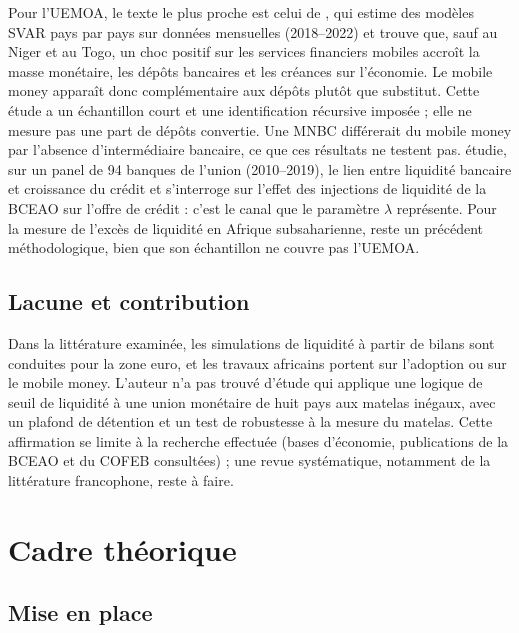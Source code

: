 \documentclass[11pt,a4paper]{article}
\begin{document}
	Pour l'UEMOA, le texte le plus proche est celui de \citet{trinnou2023}, qui estime des modèles SVAR pays par pays sur données mensuelles (2018--2022) et trouve que, sauf au Niger et au Togo, un choc positif sur les services financiers mobiles accroît la masse monétaire, les dépôts bancaires et les créances sur l'économie. Le mobile money apparaît donc complémentaire aux dépôts plutôt que substitut. Cette étude a un échantillon court et une identification récursive imposée ; elle ne mesure pas une part de dépôts convertie. Une MNBC différerait du mobile money par l'absence d'intermédiaire bancaire, ce que ces résultats ne testent pas. \citet{tadenyo2021} étudie, sur un panel de 94 banques de l'union (2010--2019), le lien entre liquidité bancaire et croissance du crédit et s'interroge sur l'effet des injections de liquidité de la BCEAO sur l'offre de crédit : c'est le canal que le paramètre $\lambda$ représente. Pour la mesure de l'excès de liquidité en Afrique subsaharienne, \citet{saxegaard2006} reste un précédent méthodologique, bien que son échantillon ne couvre pas l'UEMOA.
	
	\subsection{Lacune et contribution}
	
	Dans la littérature examinée, les simulations de liquidité à partir de bilans sont conduites pour la zone euro, et les travaux africains portent sur l'adoption ou sur le mobile money. L'auteur n'a pas trouvé d'étude qui applique une logique de seuil de liquidité à une union monétaire de huit pays aux matelas inégaux, avec un plafond de détention et un test de robustesse à la mesure du matelas. Cette affirmation se limite à la recherche effectuée (bases d'économie, publications de la BCEAO et du COFEB consultées) ; une revue systématique, notamment de la littérature francophone, reste à faire.
	
	\section{Cadre théorique}\label{sec:cadre}
	
	\subsection{Mise en place}
	
\end{document}
